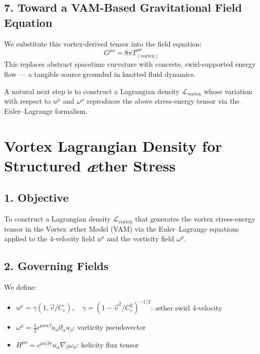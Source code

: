 \documentclass[twocolumn,aps,pre,floatfix,nofootinbib]{revtex4-2}
\begin{document}
    \subsection*{7. Toward a VAM-Based Gravitational Field Equation}

    We substitute this vortex-derived tensor into the field equation:
    \begin{equation}
        G^{\mu\nu} = 8\pi T^{\mu\nu}_{(\text{vortex})}
    \end{equation}
    This replaces abstract spacetime curvature with concrete, swirl-supported energy flow — a tangible source grounded in knotted fluid dynamics.

    A natural next step is to construct a Lagrangian density \( \mathcal{L}_{\text{vortex}} \) whose variation with respect to \( u^\mu \) and \( \omega^\mu \) reproduces the above stress-energy tensor via the Euler–Lagrange formalism.


    \section*{Vortex Lagrangian Density for Structured \textit{\ae}ther Stress}

    \subsection*{1. Objective}

    To construct a Lagrangian density \( \mathcal{L}_{\text{vortex}} \) that generates the vortex stress-energy tensor in the Vortex \textit{\ae}ther Model (VAM) via the Euler–Lagrange equations applied to the 4-velocity field \( u^\mu \) and the vorticity field \( \omega^\mu \).

    \subsection*{2. Governing Fields}

    We define:

    \begin{itemize}
        \item \( u^\mu = \gamma (1, \vec{v}/C_e), \quad \gamma = (1 - \vec{v}^2/C_e^2)^{-1/2} \): æther swirl 4-velocity
        \item \( \omega^\mu = \frac{1}{2} \epsilon^{\mu\nu\alpha\beta} u_\nu \partial_\alpha u_\beta \): vorticity pseudovector
        \item \( H^{\mu\nu} = \epsilon^{\mu\alpha\beta\sigma} u_\alpha \nabla_\beta \omega_\sigma \): helicity flux tensor
    \end{itemize}
\end{document}
